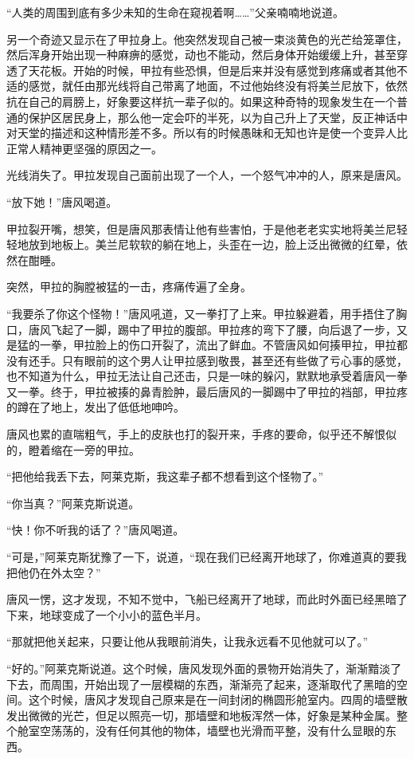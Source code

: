 “人类的周围到底有多少未知的生命在窥视着啊……”父亲喃喃地说道。

另一个奇迹又显示在了甲拉身上。他突然发现自己被一束淡黄色的光芒给笼罩住，然后浑身开始出现一种麻痹的感觉，动也不能动，然后身体开始缓缓上升，甚至穿透了天花板。开始的时候，甲拉有些恐惧，但是后来并没有感觉到疼痛或者其他不适的感觉，就任由那光线将自己带离了地面，不过他始终没有将美兰尼放下，依然抗在自己的肩膀上，好象要这样抗一辈子似的。如果这种奇特的现象发生在一个普通的保护区居民身上，那么他一定会吓的半死，以为自己升上了天堂，反正神话中对天堂的描述和这种情形差不多。所以有的时候愚昧和无知也许是使一个变异人比正常人精神更坚强的原因之一。

光线消失了。甲拉发现自己面前出现了一个人，一个怒气冲冲的人，原来是唐风。

“放下她！”唐风喝道。

甲拉裂开嘴，想笑，但是唐风那表情让他有些害怕，于是他老老实实地将美兰尼轻轻地放到地板上。美兰尼软软的躺在地上，头歪在一边，脸上泛出微微的红晕，依然在酣睡。

突然，甲拉的胸膛被猛的一击，疼痛传遍了全身。

“我要杀了你这个怪物！”唐风吼道，又一拳打了上来。甲拉躲避着，用手捂住了胸口，唐风飞起了一脚，踢中了甲拉的腹部。甲拉疼的弯下了腰，向后退了一步，又是猛的一拳，甲拉脸上的伤口开裂了，流出了鲜血。不管唐风如何揍甲拉，甲拉都没有还手。只有眼前的这个男人让甲拉感到敬畏，甚至还有些做了亏心事的感觉，也不知道为什么，甲拉无法让自己还击，只是一味的躲闪，默默地承受着唐风一拳又一拳。终于，甲拉被揍的鼻青脸肿，最后唐风的一脚踢中了甲拉的裆部，甲拉疼的蹲在了地上，发出了低低地呻吟。

唐风也累的直喘粗气，手上的皮肤也打的裂开来，手疼的要命，似乎还不解恨似的，瞪着缩在一旁的甲拉。

“把他给我丢下去，阿莱克斯，我这辈子都不想看到这个怪物了。”

“你当真？”阿莱克斯说道。

“快！你不听我的话了？”唐风喝道。

“可是，”阿莱克斯犹豫了一下，说道，“现在我们已经离开地球了，你难道真的要我把他仍在外太空？”

唐风一愣，这才发现，不知不觉中，飞船已经离开了地球，而此时外面已经黑暗了下来，地球变成了一个小小的蓝色半月。

“那就把他关起来，只要让他从我眼前消失，让我永远看不见他就可以了。”

“好的。”阿莱克斯说道。这个时候，唐风发现外面的景物开始消失了，渐渐黯淡了下去，而周围，开始出现了一层模糊的东西，渐渐亮了起来，逐渐取代了黑暗的空间。这个时候，唐风才发现自己原来是在一间封闭的椭圆形舱室内。四周的墙壁散发出微微的光芒，但足以照亮一切，那墙壁和地板浑然一体，好象是某种金属。整个舱室空荡荡的，没有任何其他的物体，墙壁也光滑而平整，没有什么显眼的东西。

